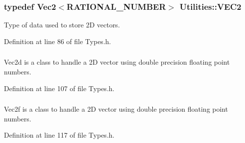 \hypertarget{namespace_utilities_a077a697d578c30ddec5ec97382be0a92}{
\subsubsection[{VEC2}]{\setlength{\rightskip}{0pt plus 5cm}typedef {\bf Vec2}$<${\bf RATIONAL\_\-NUMBER}$>$ {\bf Utilities::VEC2}}}
\label{namespace_utilities_a077a697d578c30ddec5ec97382be0a92}


Type of data used to store 2D vectors. 



Definition at line 86 of file Types.h.

\hypertarget{namespace_utilities_aaa021d29b05a070e411503f3a16dfcf7}{
\subsubsection[{Vec2d}]{}}
\label{namespace_utilities_aaa021d29b05a070e411503f3a16dfcf7}


Vec2d is a class to handle a 2D vector using double precision floating point numbers. 



Definition at line 107 of file Types.h.

\hypertarget{namespace_utilities_ab79b80d506ad1b46bfb4f7979293d5d9}{
\subsubsection[{Vec2f}]{}}
\label{namespace_utilities_ab79b80d506ad1b46bfb4f7979293d5d9}


Vec2f is a class to handle a 2D vector using double precision floating point numbers. 



Definition at line 117 of file Types.h.

\hypertarget{namespace_utilities_a491fc17b2e433b915d450c5fd8bcb459}{
\subsubsection[{Vec2i}]{}}
\label{namespace_utilities_a491fc17b2e433b915d450c5fd8bcb459}



